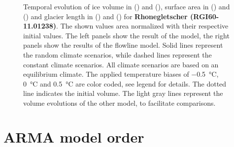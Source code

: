 \begin{figure}[p]
  \caption{Temporal evolution of ice volume in () and (), surface area in () and () and glacier length in () and () for \textbf{Rhonegletscher (RGI60-11.01238)}. The shown values area normalized with their respective initial values. The left panels show the result of the \vas{} model, the right panels show the results of the flowline model. Solid lines represent the random climate scenarios, while dashed lines represent the constant climate scenarios. All climate scenarios are based on an equilibrium climate. The applied temperature biases of \SI{-.5}{\celsius}, \SI{0}{\celsius} and \SI{+.5}{\celsius} are color coded, see legend for details. The dotted line indicates the initial volume. The light gray lines represent the volume evolutions of the other model, to facilitate comparisons.}
  \label{fig:Rhonegletscher}
\end{figure}

\chapter{ARMA model order}\label{appendix_B}
\thispagestyle{plain}


